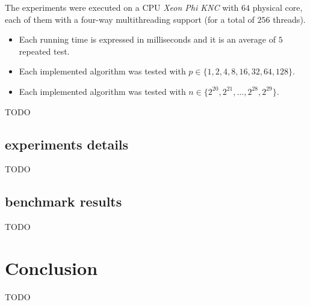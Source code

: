 \documentclass{article}
\begin{document}
The experiments were executed on a CPU \textit{Xeon Phi KNC} with $64$ physical core, each of them with a four-way multithreading support (for a total of $256$ threads).

\begin{itemize}
  \item Each running time is expressed in milliseconds and it is an average of $5$ repeated test.
  \item Each implemented algorithm was tested with $p \in \{1, 2, 4, 8, 16, 32, 64, 128\}$.
  \item Each implemented algorithm was tested with $n \in \{2^{20}, 2^{21}, \ldots, 2^{28}, 2^{29}\}$.
\end{itemize}

TODO


\subsection{experiments details}

TODO

\subsection{benchmark results}

TODO

\section{Conclusion}

TODO

\end{document}
